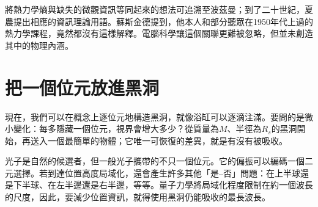 \begin{classroomqa}
\end{classroomqa}

\begin{classroomqa}
\end{classroomqa}

將熱力學熵與缺失的微觀資訊等同起來的想法可追溯至波茲曼；到了二十世紀，夏農提出相應的資訊理論用語。蘇斯金德提到，他本人和部分聽眾在1950年代上過的熱力學課程，竟然都沒有這樣解釋。電腦科學讓這個關聯更難被忽略，但並未創造其中的物理內涵。

\section{把一個位元放進黑洞}

現在，我們可以在概念上逐位元地構造黑洞，就像浴缸可以逐滴注滿。要問的是微小變化：每多隱藏一個位元，視界會增大多少？從質量為\(M\)、半徑為\(R_s\)的黑洞開始，再送入一個最簡單的物體；它唯一可恢復的差異，就是有沒有被吸收。

\begin{classroomqa}
\end{classroomqa}

光子是自然的候選者，但一般光子攜帶的不只一個位元。它的偏振可以編碼一個二元選擇。若到達位置高度局域化，還會產生許多其他「是--否」問題：在上半球還是下半球、在左半邊還是右半邊，等等。量子力學將局域化程度限制在約一個波長的尺度，因此，要減少位置資訊，就得使用黑洞仍能吸收的最長波長。

\begin{classroomqa}
\end{classroomqa}

